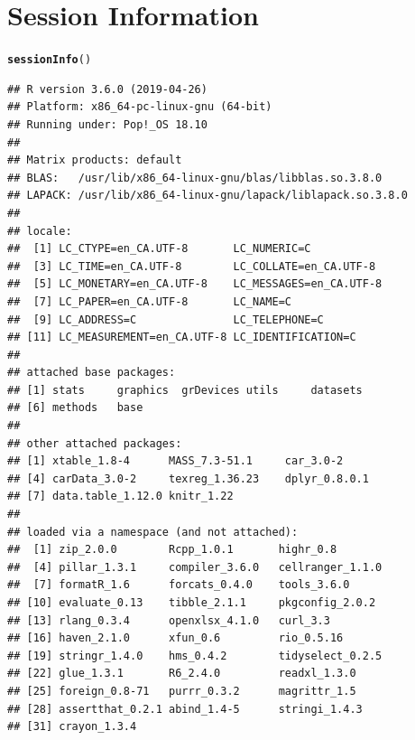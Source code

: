 \documentclass[11pt,letter]{article}\usepackage[]{graphicx}\usepackage[]{color}
\makeatletter
\newcommand{\hlstd}[1]{\textcolor[rgb]{0.345,0.345,0.345}{#1}}%
\newcommand{\hlkwd}[1]{\textcolor[rgb]{0.737,0.353,0.396}{\textbf{#1}}}%
\newenvironment{kframe}{%
 \def\at@end@of@kframe{}%
 \ifinner\ifhmode%
  \def\at@end@of@kframe{\end{minipage}}%
  \begin{minipage}{\columnwidth}%
 \fi\fi%
 \def\FrameCommand##1{\hskip\@totalleftmargin \hskip-\fboxsep
 \colorbox{shadecolor}{##1}\hskip-\fboxsep
     \hskip-\linewidth \hskip-\@totalleftmargin \hskip\columnwidth}%
 \MakeFramed {\advance\hsize-\width
   \@totalleftmargin\z@ \linewidth\hsize
   \@setminipage}}%
 {\par\unskip\endMakeFramed%
 \at@end@of@kframe}
\newenvironment{knitrout}{}{} %
\makeatother
\begin{document}
\section{Session Information}
\begin{knitrout}
\color{fgcolor}\begin{kframe}
\begin{alltt}
\hlkwd{sessionInfo}\hlstd{()}
\end{alltt}
\begin{verbatim}
## R version 3.6.0 (2019-04-26)
## Platform: x86_64-pc-linux-gnu (64-bit)
## Running under: Pop!_OS 18.10
## 
## Matrix products: default
## BLAS:   /usr/lib/x86_64-linux-gnu/blas/libblas.so.3.8.0
## LAPACK: /usr/lib/x86_64-linux-gnu/lapack/liblapack.so.3.8.0
## 
## locale:
##  [1] LC_CTYPE=en_CA.UTF-8       LC_NUMERIC=C              
##  [3] LC_TIME=en_CA.UTF-8        LC_COLLATE=en_CA.UTF-8    
##  [5] LC_MONETARY=en_CA.UTF-8    LC_MESSAGES=en_CA.UTF-8   
##  [7] LC_PAPER=en_CA.UTF-8       LC_NAME=C                 
##  [9] LC_ADDRESS=C               LC_TELEPHONE=C            
## [11] LC_MEASUREMENT=en_CA.UTF-8 LC_IDENTIFICATION=C       
## 
## attached base packages:
## [1] stats     graphics  grDevices utils     datasets 
## [6] methods   base     
## 
## other attached packages:
## [1] xtable_1.8-4      MASS_7.3-51.1     car_3.0-2        
## [4] carData_3.0-2     texreg_1.36.23    dplyr_0.8.0.1    
## [7] data.table_1.12.0 knitr_1.22       
## 
## loaded via a namespace (and not attached):
##  [1] zip_2.0.0        Rcpp_1.0.1       highr_0.8       
##  [4] pillar_1.3.1     compiler_3.6.0   cellranger_1.1.0
##  [7] formatR_1.6      forcats_0.4.0    tools_3.6.0     
## [10] evaluate_0.13    tibble_2.1.1     pkgconfig_2.0.2 
## [13] rlang_0.3.4      openxlsx_4.1.0   curl_3.3        
## [16] haven_2.1.0      xfun_0.6         rio_0.5.16      
## [19] stringr_1.4.0    hms_0.4.2        tidyselect_0.2.5
## [22] glue_1.3.1       R6_2.4.0         readxl_1.3.0    
## [25] foreign_0.8-71   purrr_0.3.2      magrittr_1.5    
## [28] assertthat_0.2.1 abind_1.4-5      stringi_1.4.3   
## [31] crayon_1.3.4
\end{verbatim}
\end{kframe}
\end{knitrout}
\end{document}

